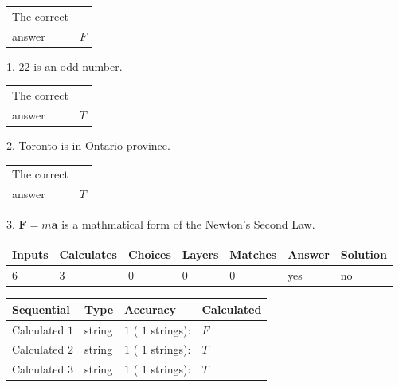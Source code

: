 \documentclass[12pt]{article}
\begin{document}
 
 
\noindent{}
 
 

 
\noindent\begin{tabular}{|l|l|}\hline The correct & \\
          answer &  %
$F$ \\ \hline \end{tabular}
1. $ %
22$ is an  %
odd number.
 
\noindent\begin{tabular}{|l|l|}\hline The correct & \\
          answer &  %
$T$ \\ \hline \end{tabular}
2.  %
Toronto is in  %
Ontario province.
 
\noindent\begin{tabular}{|l|l|}\hline The correct & \\
          answer &  %
$T$ \\ \hline \end{tabular}
3.  %
$\mathbf{F}=m\mathbf{a}$ is a mathmatical form of  %
the Newton's Second Law.
 
 
 
\noindent{}
 
 

 
\vspace{0.3in}
   
   
   
   
\noindent\begin{tabular}{|l|l|l|l|l|l|l|}
 \hline
Inputs & Calculates & Choices & Layers & Matches & Answer & Solution \\ \hline
           6  & 
           3  & 
           0
  & 
           0  & 
           0  & 
  yes & 
  no 
  \\ \hline
 \end{tabular}
   
   
   
   
\noindent{}
   
   
  
  
\noindent\begin{tabular}{|l|l|l|l|}
\hline
 Sequential & Type & Accuracy & Calculated \\ 
\hline
 
 
  Calculated $            1 $ & string & $            1  $ ( $           1  $ strings): 
 & $F$
 \\  \hline  
 
 
  Calculated $            2 $ & string & $            1  $ ( $           1  $ strings): 
 & $T$
 \\  \hline  
 
 
  Calculated $            3 $ & string & $            1  $ ( $           1  $ strings): 
 & $T$
 \\  \hline  
 \end{tabular}
   
\end{document}
